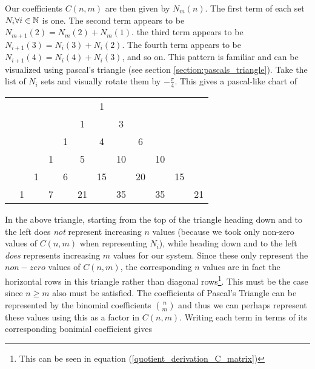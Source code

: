 Our coefficients $C(n,m)$ are then given by $N_m(n)$. The first term of each set $N_i\forall i \in {\mathbb N}$ is one. The second term appears to be $N_{m+1} (2) = N_{m} (2) + N_m(1)$. the third term appears to be $N_{i+1} (3) = N_i (3) + N_i(2)$. The fourth term appears to be $N_{i+1} (4) = N_i(4) + N_i (3)$, and so on. This pattern is familiar and can be visualized using pascal's triangle (see section \ref{section:pascals_triangle}). Take the list of $N_i$ sets and visually rotate them by $-\frac{\pi}{4}$. This gives a pascal-like chart of
\begin{center}
	\renewcommand{\arraystretch}{1.5}
	\begin{tabular}{cccccccccccc}
		&    &    &    &    &    &  1   &    &    &    &    &    \\
		&    &    &    &    &  1   &    &  3   &    &    &    &    \\
		&    &    &    &  1   &    &  4   &    &  6   &    &    &    \\
		&    &    &  1   &    &  5   &    &  10  &    &  10  &    &    \\
		&    &  1   &    &  6   &    &  15  &    &  20  &    &  15  &    \\
		&  1   &    &  7   &    &  21  &    &  35  &    &  35  &    &  21   \\
	\end{tabular}
\end{center}
In the above triangle, starting from the top of the triangle heading down and to the left does \textit{not} represent increasing $n$ values (because we took only non-zero values of $C(n,m)$ when representing $N_i$), while heading down and to the left \textit{does} represents increasing $m$ values for our system. Since these only represent the $non-zero$ values of $C(n,m)$, the corresponding $n$ values are in fact the horizontal rows in this triangle rather than diagonal rows\footnote{This can be seen in equation (\ref{quotient_derivation_C_matrix})}. This must be the case since $n \geq m$ also must be satisfied. The coefficients of Pascal's Triangle can be represented by the binomial coefficients $\binom{n}{m}$ and thus we can perhaps represent these values using this as a factor in $C(n,m)$. Writing each term in terms of its corresponding bonimial coefficient gives
